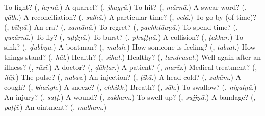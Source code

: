 \begin{tcolorbox}[breakable,colback=teal!4,colframe=teal!35!black,title={Before you move on}]
To fight? (\textbf{}, \emph{laṛnā}.) A quarrel? (\textbf{}, \emph{jhagṛā}.) To hit? (\textbf{}, \emph{mārnā}.) A swear word? (\textbf{}, \emph{gālh}.) A reconciliation? (\textbf{}, \emph{sulhā}.) A particular time? (\textbf{}, \emph{velā}.) To go by (of time)? (\textbf{}, \emph{bītṇā}.) An era? (\textbf{}, \emph{zamānā}.) To regret? (\textbf{}, \emph{pachhtāuṇā}.) To spend time? (\textbf{}, \emph{guzārnā}.) To fly? (\textbf{}, \emph{uḍḍṇā}.) To burst? (\textbf{}, \emph{phuṭṭṇā}.) A collision? (\textbf{}, \emph{ṭakkar}.) To sink? (\textbf{}, \emph{ḍubbṇā}.) A boatman? (\textbf{}, \emph{malāh}.) How someone is feeling? (\textbf{}, \emph{tabīat}.) How things stand? (\textbf{}, \emph{hāl}.) Health? (\textbf{}, \emph{sihat}.) Healthy? (\textbf{}, \emph{tandrusat}.) Well again after an illness? (\textbf{}, \emph{rāzī}.) A doctor? (\textbf{}, \emph{ḍākṭar}.) A patient? (\textbf{}, \emph{marīz}.) Medical treatment? (\textbf{}, \emph{ilāj}.) The pulse? (\textbf{}, \emph{nabaz}.) An injection? (\textbf{}, \emph{ṭīkā}.) A head cold? (\textbf{}, \emph{zukām}.) A cough? (\textbf{}, \emph{khaṅgh}.) A sneeze? (\textbf{}, \emph{chhikk}.) Breath? (\textbf{}, \emph{sāh}.) To swallow? (\textbf{}, \emph{nigalṇā}.) An injury? (\textbf{}, \emph{saṭṭ}.) A wound? (\textbf{}, \emph{zakham}.) To swell up? (\textbf{}, \emph{sujjṇā}.) A bandage? (\textbf{}, \emph{paṭṭī}.) An ointment? (\textbf{}, \emph{malham}.)
\end{tcolorbox}
